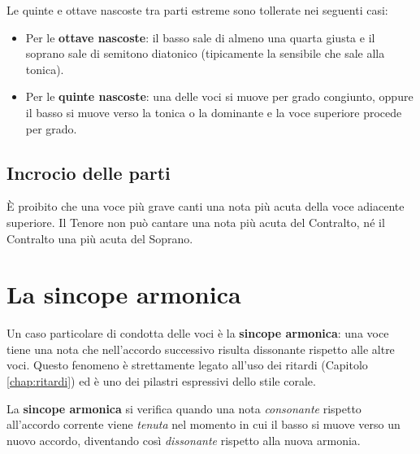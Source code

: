 \begin{regola}
	\label{reg:eccezioni_nascoste}
	Le quinte e ottave nascoste tra parti estreme sono tollerate nei seguenti casi:
	\begin{itemize}
		\item Per le \textbf{ottave nascoste}: il basso sale di almeno una quarta giusta e il soprano sale di semitono diatonico (tipicamente la sensibile che sale alla tonica).
		\item Per le \textbf{quinte nascoste}: una delle voci si muove per grado congiunto, oppure il basso si muove verso la tonica o la dominante e la voce superiore procede per grado.
	\end{itemize}
\end{regola}

\subsection{Incrocio delle parti}

\begin{errore}
	\label{err:incrocio}
	È proibito che una voce più grave canti una nota più acuta della voce adiacente superiore. Il Tenore non può cantare una nota più acuta del Contralto, né il Contralto una più acuta del Soprano.
\end{errore}

\section{La sincope armonica}
\label{sec:sincope_armonica}

Un caso particolare di condotta delle voci è la \textbf{sincope armonica}: una voce tiene una nota che nell'accordo successivo risulta dissonante rispetto alle altre voci. Questo fenomeno è strettamente legato all'uso dei ritardi (Capitolo \ref{chap:ritardi}) ed è uno dei pilastri espressivi dello stile corale.

\begin{definizione}
	\label{def:sincope_armonica}
	La \textbf{sincope armonica} si verifica quando una nota \textit{consonante} rispetto all'accordo corrente viene \textit{tenuta} nel momento in cui il basso si muove verso un nuovo accordo, diventando così \textit{dissonante} rispetto alla nuova armonia.
\end{definizione}

